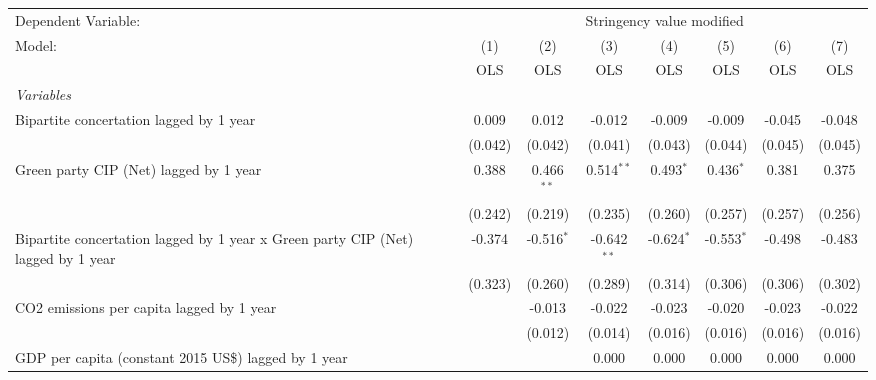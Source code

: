 
\begingroup
\centering
\begin{tabular}{lccccccc}
   \toprule
   Dependent Variable: & \multicolumn{7}{c}{Stringency value modified}\\
   Model:                                                                           & (1)     & (2)          & (3)           & (4)          & (5)          & (6)            & (7)\\  
                                                                                    &  OLS    & OLS          & OLS           & OLS          & OLS          & OLS            & OLS\\  
   \midrule
   \emph{Variables}\\
   Bipartite concertation lagged by 1 year                                          & 0.009   & 0.012        & -0.012        & -0.009       & -0.009       & -0.045         & -0.048\\   
                                                                                    & (0.042) & (0.042)      & (0.041)       & (0.043)      & (0.044)      & (0.045)        & (0.045)\\   
   Green party CIP (Net) lagged by 1 year                                           & 0.388   & 0.466$^{**}$ & 0.514$^{**}$  & 0.493$^{*}$  & 0.436$^{*}$  & 0.381          & 0.375\\   
                                                                                    & (0.242) & (0.219)      & (0.235)       & (0.260)      & (0.257)      & (0.257)        & (0.256)\\   
   Bipartite concertation lagged by 1 year x Green party CIP (Net) lagged by 1 year & -0.374  & -0.516$^{*}$ & -0.642$^{**}$ & -0.624$^{*}$ & -0.553$^{*}$ & -0.498         & -0.483\\   
                                                                                    & (0.323) & (0.260)      & (0.289)       & (0.314)      & (0.306)      & (0.306)        & (0.302)\\   
   CO2 emissions per capita lagged by 1 year                                        &         & -0.013       & -0.022        & -0.023       & -0.020       & -0.023         & -0.022\\   
                                                                                    &         & (0.012)      & (0.014)       & (0.016)      & (0.016)      & (0.016)        & (0.016)\\   
   GDP per capita (constant 2015 US\$) lagged by 1 year                             &         &              & 0.000         & 0.000        & 0.000        & 0.000          & 0.000\\   

\end{tabular}
